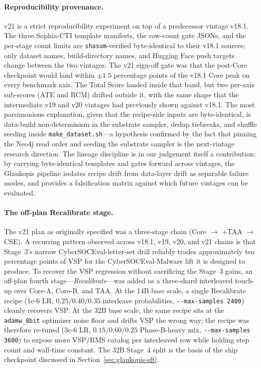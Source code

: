 \documentclass[conference]{IEEEtran}
\providecommand{\hfid}[1]{{\small\nolinkurl{#1}}}
\begin{document}
\paragraph{Reproducibility provenance.}
v21 is a strict reproducibility experiment on top of a predecessor vintage v18.1. The three Sophia-CTI template manifests, the row-count gate JSONs, and the per-stage count limits are \texttt{shasum}-verified byte-identical to their v18.1 sources; only dataset names, build-directory names, and Hugging Face push targets change between the two vintages. The v21 sign-off gate was that the post-Core checkpoint would land within $\pm 1.5$ percentage points of the v18.1 Core peak on every benchmark axis. The Total Score landed inside that band, but two per-axis sub-scores (ATE and RCM) drifted outside it, with the same shape that the intermediate v19 and v20 vintages had previously shown against v18.1. The most parsimonious explanation, given that the recipe-side inputs are byte-identical, is data-build non-determinism in the substrate sampler, dedup tiebreaks, and shuffle seeding inside \hfid{make_dataset.sh}---a hypothesis confirmed by the fact that pinning the Neo4j read order and seeding the substrate sampler is the next-vintage research direction. The lineage discipline is in our judgement itself a contribution: by carrying byte-identical templates and gates forward across vintages, the Glaukopis pipeline isolates recipe drift from data-layer drift as separable failure modes, and provides a falsification matrix against which future vintages can be evaluated.

\paragraph{The off-plan Recalibrate stage.}
The v21 plan as originally specified was a three-stage chain (Core $\to$ +TAA $\to$ CSE). A recurring pattern observed across v18.1, v19, v20, and v21 chains is that Stage~3's narrow CyberSOCEval-letter-set drill reliably trades approximately ten percentage points of VSP for the CyberSOCEval-Malware lift it is designed to produce. To recover the VSP regression without sacrificing the Stage~3 gains, an off-plan fourth stage---\emph{Recalibrate}---was added as a three-shard interleaved touch-up over Core-A, Core-B, and TAA. At the 14B base scale, a single Recalibrate recipe (1e-6 LR, $0.25 / 0.40 / 0.35$ interleave probabilities, \hfid{--max-samples 2400}) cleanly recovers VSP. At the 32B base scale, the same recipe sits at the \hfid{adamw_8bit} optimizer noise floor and drifts VSP the wrong way; the recipe was therefore re-tuned (3e-6 LR, $0.15 / 0.60 / 0.25$ Phase-B-heavy mix, \hfid{--max-samples 3600}) to expose more VSP/RMS catalog per interleaved row while holding step count and wall-time constant. The 32B Stage~4 split is the basis of the ship checkpoint discussed in Section~\ref{sec:glaukopis-sft}.
\end{document}
